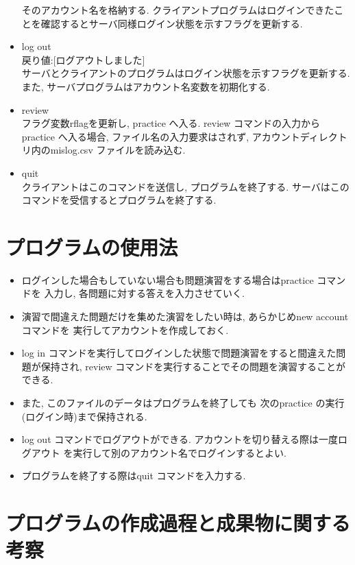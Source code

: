 \documentclass[a4j]{jarticle}
\begin{document}
\begin{itemize}
  そのアカウント名を格納する.
  クライアントプログラムはログインできたことを確認するとサーバ同様ログイン状態を示すフラグを更新する. 
\item log out\\
  戻り値:$[$ログアウトしました$]$\\
  サーバとクライアントのプログラムはログイン状態を示すフラグを更新する.
  また, サーバプログラムはアカウント名変数を初期化する.
\item review\\
  フラグ変数rflagを更新し, practice へ入る.
  review コマンドの入力からpractice へ入る場合, ファイル名の入力要求はされず,
  アカウントディレクトリ内のmislog.csv ファイルを読み込む. 
\item quit\\
  クライアントはこのコマンドを送信し, プログラムを終了する.
  サーバはこのコマンドを受信するとプログラムを終了する. 
\end{itemize}

\section{プログラムの使用法}
\begin{itemize}
\item ログインした場合もしていない場合も問題演習をする場合はpractice コマンドを
入力し, 各問題に対する答えを入力させていく.
\item 演習で間違えた問題だけを集めた演習をしたい時は, あらかじめnew account コマンドを
実行してアカウントを作成しておく.
\item log in コマンドを実行してログインした状態で問題演習をすると間違えた問題が保持され,
review コマンドを実行することでその問題を演習することができる.
\item また, このファイルのデータはプログラムを終了しても
次のpractice の実行(ログイン時)まで保持される.
\item log out コマンドでログアウトができる. アカウントを切り替える際は一度ログアウト
を実行して別のアカウント名でログインするとよい.
\item プログラムを終了する際はquit コマンドを入力する. 
\end{itemize}
\section{プログラムの作成過程と成果物に関する考察}
\end{document}
